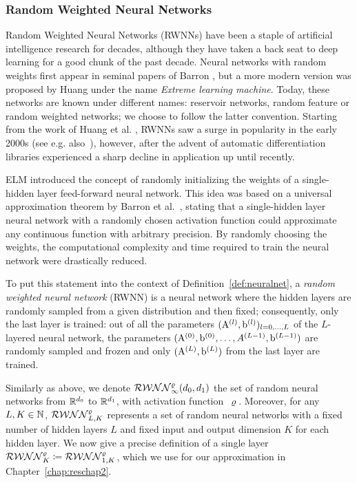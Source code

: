 \subsubsection{Random Weighted Neural Networks}
Random Weighted Neural Networks (RWNNs) have been a staple of artificial intelligence research for decades, although they have taken a back seat to deep learning for a good chunk of the past decade. Neural networks with random weights first appear in seminal papers of Barron \cite{Barron1992NeuralSystems, Barron1993UniversalFunction}, but a more modern version was proposed by Huang \cite{Huang2006UniversalNodes} under the name \textit{Extreme learning machine}. Today, these networks are known under different names: reservoir networks, random feature or random weighted networks; we choose to follow the latter convention. Starting from the work of Huang et al. \cite{Huang2006UniversalNodes}, RWNNs saw a surge in popularity in the early 2000s (see e.g. also~\cite{Rahimi2007RandomMachines, Rahimi2008WeightedLearning}), however, after the advent of automatic differentiation libraries experienced a sharp decline in application up until recently.

ELM introduced the concept of randomly initializing the weights of a single-hidden layer feed-forward neural network. This idea was based on a universal approximation theorem by Barron et al.~\cite{Barron1993UniversalFunction}, stating that a single-hidden layer neural network with a randomly chosen activation function could approximate any continuous function with arbitrary precision. By randomly choosing the weights, the computational complexity and time required to train the neural network were drastically reduced.

To put this statement into the context of Definition~\ref{def:neuralnet}, a \textit{random weighted neural network} (RWNN) is a neural network where the hidden layers are randomly sampled from a given distribution and then fixed; consequently, only the last layer is trained:
out of all the parameters $(\mathrm{A}^{(l)}, \mathrm{b}^{(l)})_{l=0,\ldots,L}$ of the $L$-layered neural network, the parameters $(\mathrm{A}^{(0)}, \mathrm{b}^{(0)}, \ldots, A^{(L-1)}, \mathrm{b}^{(L-1)})$ are randomly sampled and frozen and only $(\mathrm{A}^{(L)}, \mathrm{b}^{(L)})$ from the last layer are trained. 

Similarly as above, we denote $\mathcal{RWNN}_{\infty}^{\varrho}(d_0,d_1)$ the set of random neural networks from $\mathbb{R}^{d_0}$ to $\mathbb{R}^{d_1}$, with activation function~$\varrho$. %
Moreover, for any $L, K \in \mathbb{N}$, $\mathcal{RWNN}_{L, K}^\varrho$ represents a set of random neural networks with a fixed number of hidden layers $L$ and fixed input and output dimension $K$ for each hidden layer. 
We now give a precise definition of a single layer $\mathcal{RWNN}^\varrho_{K}\coloneqq\mathcal{RWNN}^\varrho_{1, K}$, which we use for our approximation in Chapter~\ref{chap:reschap2}.

